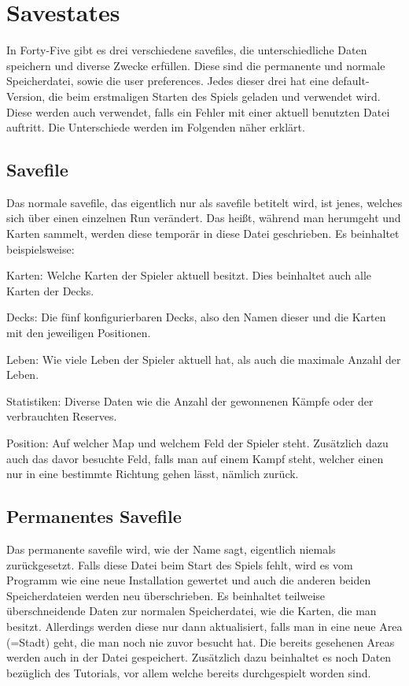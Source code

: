 
\renewcommand{\kapitelautor}{Autor: Felix Zwickelstorfer}
\section{Savestates}\label{sec:savestates}
\renewcommand{\kapitelautor}{Autor: Felix Zwickelstorfer}

In Forty-Five gibt es drei verschiedene savefiles, die unterschiedliche Daten speichern und diverse Zwecke erfüllen.
Diese sind die permanente und normale Speicherdatei, sowie die user preferences.
Jedes dieser drei hat eine default-Version, die beim erstmaligen Starten des Spiels geladen und verwendet wird.
Diese werden auch verwendet, falls ein Fehler mit einer aktuell benutzten Datei auftritt.
Die Unterschiede werden im Folgenden näher erklärt.

\subsection{Savefile}\label{subsec:savefile}

Das normale savefile, das eigentlich nur als savefile betitelt wird, ist jenes, welches sich über einen einzelnen Run verändert.
Das heißt, während man herumgeht und Karten sammelt, werden diese temporär in diese Datei geschrieben.
Es beinhaltet beispielsweise:
\begin{liste}
    \item Karten: Welche Karten der Spieler aktuell besitzt.
    Dies beinhaltet auch alle Karten der Decks.
    \item Decks: Die fünf konfigurierbaren Decks, also den Namen dieser und die Karten mit den jeweiligen Positionen.
    \item Leben: Wie viele Leben der Spieler aktuell hat, als auch die maximale Anzahl der Leben.
    \item Statistiken: Diverse Daten wie \zB die Anzahl der gewonnenen Kämpfe oder der verbrauchten Reserves.
    \item Position: Auf welcher Map und welchem Feld der Spieler steht.
    Zusätzlich dazu auch das davor besuchte Feld, falls man auf einem Kampf steht, welcher einen nur in eine bestimmte Richtung gehen lässt, nämlich zurück.
\end{liste}

\subsection{Permanentes Savefile}\label{subsec:perma-savefile}
Das permanente savefile wird, wie der Name sagt, eigentlich niemals zurückgesetzt.
Falls diese Datei beim Start des Spiels fehlt, wird es vom Programm wie eine neue Installation gewertet und auch die anderen beiden Speicherdateien werden neu überschrieben.
Es beinhaltet teilweise überschneidende Daten zur normalen Speicherdatei, wie die Karten, die man besitzt.
Allerdings werden diese nur dann aktualisiert, falls man in eine neue Area (=Stadt) geht, die man noch nie zuvor besucht hat.
Die bereits gesehenen Areas werden auch in der Datei gespeichert.
Zusätzlich dazu beinhaltet es noch Daten bezüglich des Tutorials, vor allem welche bereits durchgespielt worden sind.


